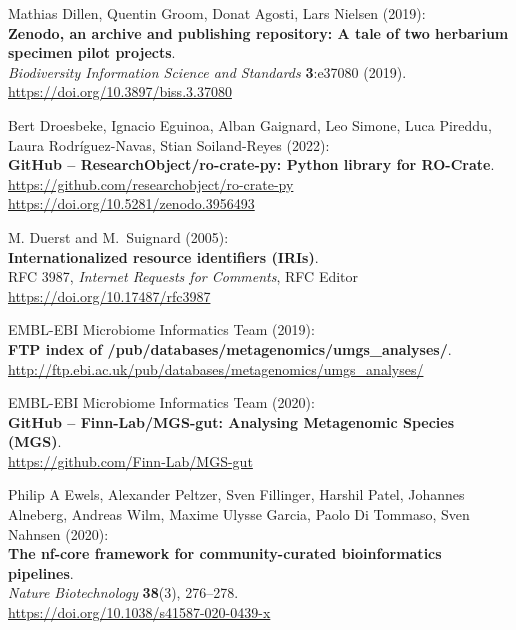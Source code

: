 \begin{thebibliography}{9}
Mathias Dillen, Quentin Groom, Donat Agosti, Lars Nielsen
(2019):\\
\textbf{Zenodo, an archive and publishing repository: A tale of two
herbarium specimen pilot projects}.\\
\emph{Biodiversity Information Science and Standards} \textbf{3}:e37080
(2019).\\
\url{https://doi.org/10.3897/biss.3.37080}

Bert Droesbeke, Ignacio Eguinoa, Alban Gaignard, Leo Simone,
Luca Pireddu, Laura Rodríguez-Navas, Stian Soiland-Reyes (2022):\\
\textbf{GitHub -- ResearchObject/ro-crate-py: Python library for
RO-Crate}.\\
\url{https://github.com/researchobject/ro-crate-py}\\
\url{https://doi.org/10.5281/zenodo.3956493}

M. Duerst and M.~Suignard (2005):\\
\textbf{Internationalized resource identifiers (IRIs)}.\\
RFC 3987, \emph{Internet Requests for Comments}, RFC Editor\\
\url{https://doi.org/10.17487/rfc3987}

EMBL-EBI Microbiome Informatics Team (2019):\\
\textbf{FTP index of /pub/databases/metagenomics/umgs\_analyses/}.\\
\url{http://ftp.ebi.ac.uk/pub/databases/metagenomics/umgs_analyses/}

EMBL-EBI Microbiome Informatics Team (2020):\\
\textbf{GitHub -- Finn-Lab/MGS-gut: Analysing Metagenomic Species
(MGS)}.\\
\url{https://github.com/Finn-Lab/MGS-gut}

Philip A Ewels, Alexander Peltzer, Sven Fillinger, Harshil
Patel, Johannes Alneberg, Andreas Wilm, Maxime Ulysse Garcia, Paolo Di
Tommaso, Sven Nahnsen (2020):\\
\textbf{The nf-core framework for community-curated bioinformatics
pipelines}.\\
\emph{Nature Biotechnology} \textbf{38}(3), 276--278.\\
\url{https://doi.org/10.1038/s41587-020-0439-x}


\end{thebibliography}
